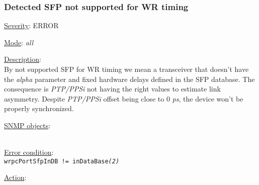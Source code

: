 \subsubsection{\bf Detected SFP not supported for WR timing}
		\label{fail:timing:wrong_sfp}
		\begin{pck_descr}
			\item [] \underline{Severity}: ERROR
			\item [] \underline{Mode}: \emph{all}
			\item [] \underline{Description}:\\
				By not supported SFP for WR timing we mean a transceiver that doesn't
				have the \emph{alpha} parameter and fixed hardware delays defined in the
				SFP database. The consequence is \emph{PTP/PPSi} not having the right
				values to estimate link asymmetry. Despite \emph{PTP/PPSi} offset being
				close to 0 \emph{ps}, the device won't be properly synchronized.
			\item [] \underline{SNMP objects}:\\
				{\footnotesize
				\\
				 }
			\item [] \underline{Error condition}:\\
				{\footnotesize
        \texttt{wrpcPortSfpInDB != inDataBase\emph{(2)}} }
      \item [] \underline{Action}:\\
		\end{pck_descr}

